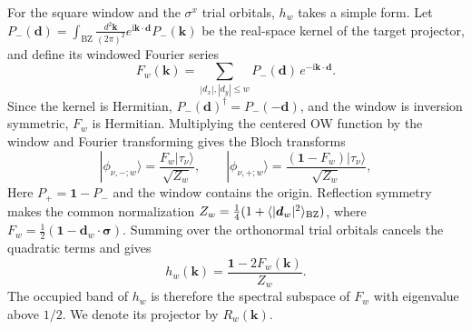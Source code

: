 \documentclass[aps,prb,10pt,twocolumn,superscriptaddress,longbibliography,floatfix]{revtex4-2}
\newcommand{\ii}{\mathrm{i}}
\newcommand{\mr}[1]{\mathrm{#1}}
\newcommand{\Id}{\mathbf{1}}
\newcommand{\bk}{\boldsymbol k}
\newcommand{\newtext}[1]{{\color{blue}#1}}
\begin{document}
{\color{orange}
For the square window and the $\sigma^x$ trial orbitals, $h_w$ takes a simple form. Let $P_-(\boldsymbol d)=\int_{\mr{BZ}}\frac{d^2\bk}{(2\pi)^2}e^{\ii\bk\cdot\boldsymbol d}P_-(\bk)$ be the real-space kernel of the target projector, and define its windowed Fourier series
\begin{equation}
    F_w(\bk)=\sum_{|d_x|,|d_y|\leq w}P_-(\boldsymbol d)\,e^{-\ii\bk\cdot\boldsymbol d}.
    \label{eq:WindowedProjector}
\end{equation}
Since the kernel is Hermitian, $P_-(\boldsymbol d)^\dagger=P_-(-\boldsymbol d)$, and the window is inversion symmetric, $F_w$ is Hermitian. Multiplying the centered OW function by the window and Fourier transforming gives the Bloch transforms
\begin{equation}
    |\phi_{\nu,-;w}\rangle=\frac{F_w|\tau_\nu\rangle}{\sqrt{Z_w}},
    \qquad
    |\phi_{\nu,+;w}\rangle=\frac{(\Id-F_w)|\tau_\nu\rangle}{\sqrt{Z_w}},
    \label{eq:TruncatedBloch}
\end{equation}
\newtext{Here $P_+=\Id-P_-$ and the window contains the origin. Reflection symmetry makes the common normalization $Z_w=\frac14(1+\langle|\boldsymbol d_w|^2\rangle_{\rm BZ})$, where $F_w=\frac12(\Id-\boldsymbol d_w\cdot\boldsymbol\sigma)$. Summing over the orthonormal trial orbitals cancels the quadratic terms and gives}
\begin{equation}
 h_w(\bk)=\frac{\Id-2F_w(\bk)}{Z_w}.
 \label{eq:FrameIdentity}
\end{equation}
The occupied band of $h_w$ is therefore the spectral subspace of $F_w$ with eigenvalue above $1/2$. We denote its projector by $R_w(\bk)$.

}
\end{document}
